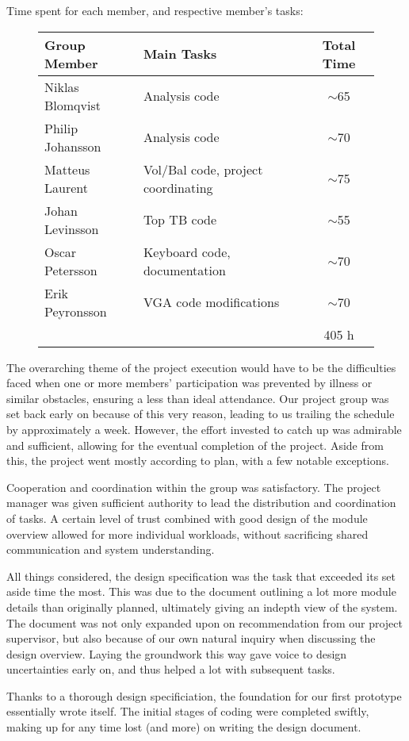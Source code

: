 Time spent for each member, and respective member's tasks:

\begin{figure}[h] %
  \centering
  \begin{tabular}{|l|l|c|}
    \hline
    Group Member & Main Tasks & Total Time \\
    \hline
    Niklas Blomqvist & Analysis code & $\sim$65\\
    Philip Johansson & Analysis code & $\sim$70\\
    Matteus Laurent & Vol/Bal code, project coordinating & $\sim$75\\
    Johan Levinsson	& Top TB code &	$\sim$55\\
    Oscar Petersson	& Keyboard code, documentation & $\sim$70\\
    Erik Peyronsson	& VGA code modifications & $\sim$70 \\
    \cline{3-3}
    && 405 h\\
    \hline
  \end{tabular}
\end{figure}

The overarching theme of the project execution would have to be the difficulties faced when one or more members' participation was prevented by illness or similar obstacles, ensuring a less than ideal attendance. Our project group was set back early on because of this very reason, leading to us trailing the schedule by approximately a week. However, the effort invested to catch up was admirable and sufficient, allowing for the eventual completion of the project. Aside from this, the project went mostly according to plan, with a few notable exceptions.

Cooperation and coordination within the group was satisfactory. The project manager was given sufficient authority to lead the distribution and coordination of tasks. A certain level of trust combined with good design of the module overview allowed for more individual workloads, without sacrificing shared communication and system understanding.

All things considered, the design specification was the task that exceeded its set aside time the most. This was due to the document outlining a lot more module details than originally planned, ultimately giving an indepth view of the system. The document was not only expanded upon on recommendation from our project supervisor, but also because of our own natural inquiry when discussing the design overview. Laying the groundwork this way gave voice to design uncertainties early on, and thus helped a lot with subsequent tasks.

Thanks to a thorough design specificiation, the foundation for our first prototype essentially wrote itself. The initial stages of coding were completed swiftly, making up for any time lost (and more) on writing the design document.
